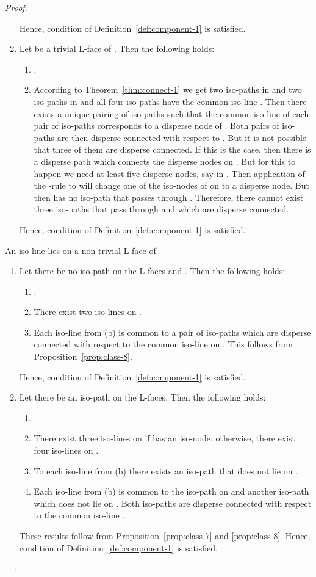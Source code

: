 \documentclass[a4paper,11pt]{article}
\begin{document}
\begin{proof}
\begin{enumerate}
Hence, condition  of Definition~\ref{def:component-1} is satisfied.
\item Let  be a trivial L-face of . Then the following holds:
\begin{enumerate}
\item .
\item According to Theorem~\ref{thm:connect-1} we get two iso-paths in  and two iso-paths in  and
all four iso-paths have the common iso-line . Then there exists a unique pairing of iso-paths such that
the common iso-line  of each pair of iso-paths corresponds to a disperse node of . Both pairs of
iso-paths are then disperse connected with respect to . But it is not possible that three of them
are disperse connected. If this is the case, then there is a disperse path which connects the disperse
nodes on . But for this to happen we need at least five disperse nodes, say in . Then application of
the -rule to  will change one of the iso-nodes of  on  to a disperse node. But then
 has no iso-path that passes through . Therefore, there cannot exist three iso-paths that pass
through  and which are disperse connected.
\end{enumerate}
Hence, condition  of Definition~\ref{def:component-1} is satisfied.
\end{enumerate}
An iso-line  lies on a non-trivial L-face
 of .
\begin{enumerate}
\item Let there be no iso-path on the L-faces  and . Then the following holds:
\begin{enumerate}
\item .
\item There exist two iso-lines on .
\item Each iso-line from (b) is common to a pair of iso-paths which are disperse connected with respect to
the common iso-line on . This follows from Proposition~\ref{prop:class-8}.
\end{enumerate}
Hence, condition  of Definition~\ref{def:component-1} is satisfied.
\item Let there be an iso-path on the L-faces. Then the following holds:
\begin{enumerate}
\item .
\item There exist three iso-lines on  if  has an iso-node; otherwise, there exist four iso-lines on .
\item To each iso-line from (b) there exists an iso-path that does not lie on .
\item Each iso-line from (b) is common to the iso-path on  and another iso-path which does not lie on
. Both iso-paths are disperse connected with respect to the common iso-line .
\end{enumerate}
These results follow from Proposition~\ref{prop:class-7} and \ref{prop:class-8}. Hence, condition  of
Definition~\ref{def:component-1} is satisfied.
\end{enumerate}
\end{proof}
\end{document}
